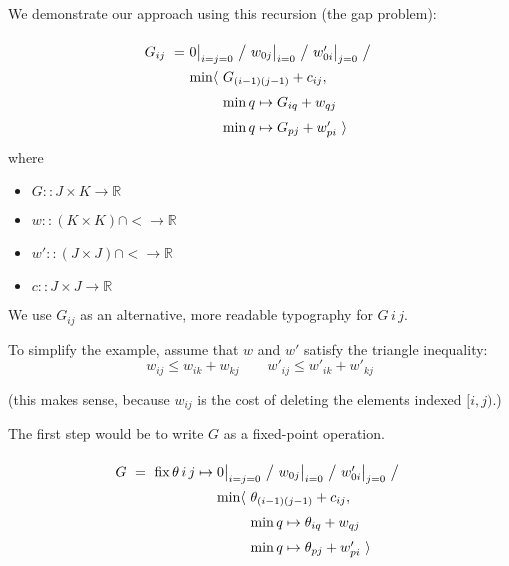 \documentclass{article}
\newcommand\R{\mathbb{R}}
\begin{document}
We demonstrate our approach using this recursion (the gap problem):

\[
\renewcommand\arraystretch{1.5}
\begin{array}{l@{}l}
G_{ij} ~=~  &
  0\big|_{i=j=0} ~\big/~ w_{0j}\big|_{i=0} ~\big/~ w'_{0i}\big|_{j=0}
  ~\big/~ \\
  &
  \begin{array}{@{}l@{~}l}
    \min\langle & G_{(i-1)(j-1)} + c_{ij}, \\
                & \min q\mapsto G_{iq} + w_{qj} \\
                & \min q\mapsto G_{pj} + w'_{pi}~\rangle
  \end{array}
\end{array}
\]
%
where
\begin{itemize}
  \item $G :: J\times K \to \R$
  \item $w :: (K \times K)\cap{<} \to \R$
  \item $w' :: (J \times J)\cap{<} \to \R$
  \item $c :: J \times J \to \R$
\end{itemize}

We use $G_{ij}$ as an alternative, more readable typography for $G\,i\,j$.

To simplify the example, assume that $w$ and $w'$ satisfy the triangle inequality:
%
\begin{equation}
w_{ij} \leq w_{ik} + w_{kj} \qquad w'_{ij} \leq w'_{ik} + w'_{kj}
\label{equ:triangle}
\end{equation}

(this makes sense, because $w_{ij}$ is the cost of deleting the elements indexed $[i,j)$.)

\bigskip
The first step would be to write $G$ as a fixed-point operation.

\[
\renewcommand\arraystretch{1.5}
\begin{array}{l@{}l}
G ~=~ \mathrm{fix}\, \theta\,i\,j \mapsto{} &
  0\big|_{i=j=0} ~\big/~ w_{0j}\big|_{i=0} ~\big/~ w'_{0i}\big|_{j=0}
  ~\big/~ \\
  &
  \begin{array}{@{}l@{~}l}
    \min\langle & \theta_{(i-1)(j-1)} + c_{ij}, \\
                & \min q\mapsto \theta_{iq} + w_{qj} \\
                & \min q\mapsto \theta_{pj} + w'_{pi}~\rangle
  \end{array}
\end{array}
\]
\end{document}
